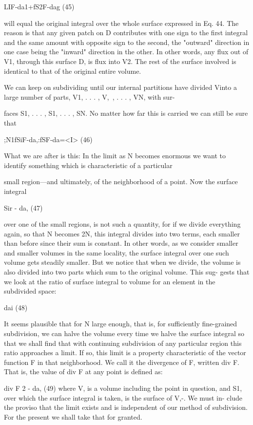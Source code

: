 LIF-da1+fS2F-dag (45)

will equal the original integral over the whole surface expressed in
Eq. 44. The reason is that any given patch on D contributes with
one sign to the first integral and the same amount with opposite sign
to the second, the "outward" direction in one case being the "inward"
direction in the other. In other words, any flux out of V1, through
this surface D, is flux into V2. The rest of the surface involved is
identical to that of the original entire volume.

We can keep on subdividing until our internal partitions have
divided Vinto a large number of parts, V1, . . . , V,~, . . . , VN, with sur-

faces S1, . . . , S1, . . . , SN. No matter how far this is carried we can
still be sure that

;N1fSiF-da,:fSF-da=<I> (46)

What we are after is this: In the limit as N becomes enormous we
want to identify something which is characteristic of a particular

small region---and ultimately, of the neighborhood of a point. Now
the surface integral

Sir - da, (47)

over one of the small regions, is not such a quantity, for if we divide
everything again, so that N becomes 2N, this integral divides into two
terms, each smaller than before since their sum is constant. In other
words, as we consider smaller and smaller volumes in the same
locality, the surface integral over one such volume gets steadily
smaller. But we notice that when we divide, the volume is also
divided into two parts which sum to the original volume. This sug-
gests that we look at the ratio of surface integral to volume for an
element in the subdivided space:

 dai (48)

It seems plausible that for N large enough, that is, for sufficiently
fine-grained subdivision, we can halve the volume every time we
halve the surface integral so that we shall find that with continuing
subdivision of any particular region this ratio approaches a limit. If
so, this limit is a property characteristic of the vector function F in
that neighborhood. We call it the divergence of F, written div F.
That is, the value of div F at any point is defined as:

div F 2  - da, (49)
where V, is a volume including the point in question, and S1, over
which the surface integral is taken, is the surface of V,-. We must in-
clude the proviso that the limit exists and is independent of our
method of subdivision. For the present we shall take that for
granted.

